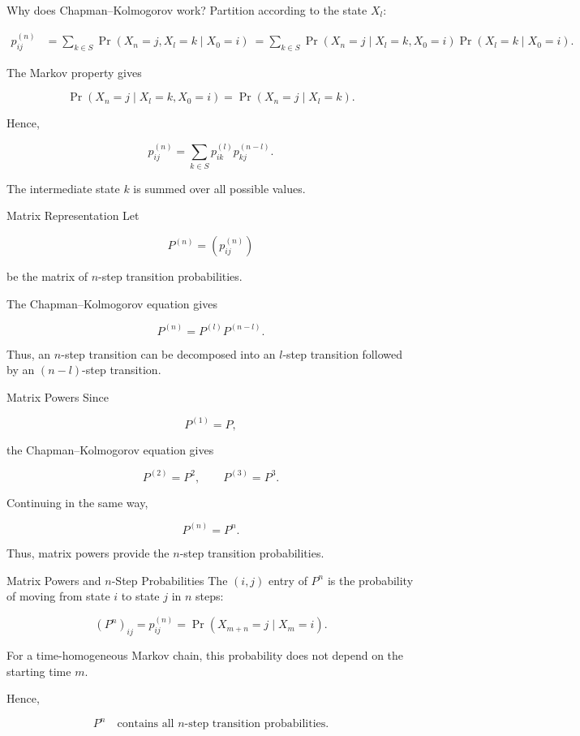 \documentclass[
  ignorenonframetext,
  aspectratio=169,
]{beamer}
\begin{document}
\begin{frame}{Why does Chapman--Kolmogorov work?}
\protect{}\label{why-does-chapmankolmogorov-work}
Partition according to the state \(X_l\):

\[
\begin{aligned}
p_{ij}^{(n)}
&=
\sum_{k\in S}
\Pr(X_n=j,X_l=k\mid X_0=i)\
=
\sum_{k\in S}
\Pr(X_n=j\mid X_l=k,X_0=i)
\Pr(X_l=k\mid X_0=i).
\end{aligned}
\]

The Markov property gives

\[
\Pr(X_n=j\mid X_l=k,X_0=i)
=\Pr(X_n=j\mid X_l=k).
\]

Hence,

\[
p_{ij}^{(n)}
=\sum_{k\in S}
p_{ik}^{(l)}
p_{kj}^{(n-l)}.
\]

The intermediate state \(k\) is summed over all possible values.
\end{frame}

\begin{frame}{Matrix Representation}
\protect{}\label{matrix-representation}
Let

\[
P^{(n)}=(p_{ij}^{(n)})
\]

be the matrix of \(n\)-step transition probabilities.

The Chapman--Kolmogorov equation gives

\[
\boxed{
P^{(n)}
=
P^{(l)}P^{(n-l)}.
}
\]

Thus, an \(n\)-step transition can be decomposed into an \(l\)-step
transition followed by an \((n-l)\)-step transition.
\end{frame}

\begin{frame}{Matrix Powers}
\protect{}\label{matrix-powers}
Since

\[
P^{(1)}=P,
\]

the Chapman--Kolmogorov equation gives

\[
P^{(2)}=P^2,
\qquad
P^{(3)}=P^3.
\]

Continuing in the same way,

\[
\boxed{
P^{(n)}=P^n.
}
\]

Thus, matrix powers provide the \(n\)-step transition probabilities.
\end{frame}

\begin{frame}{Matrix Powers and \(n\)-Step Probabilities}
\protect{}\label{matrix-powers-and-n-step-probabilities}
The \((i,j)\) entry of \(P^n\) is the probability of moving from state
\(i\) to state \(j\) in \(n\) steps:

\[
\boxed{
(P^n)_{ij}
=
p_{ij}^{(n)}
=
\Pr(X_{m+n}=j\mid X_m=i).
}
\]

For a time-homogeneous Markov chain, this probability does not depend on
the starting time \(m\).

Hence,

\[
\boxed{
P^n
\quad\text{contains all $n$-step transition probabilities.}
}
\]
\end{frame}
\end{document}
